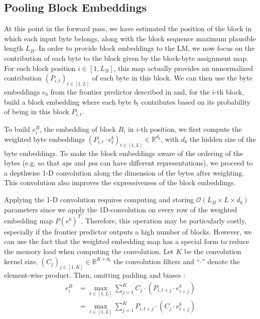 \subsection{Pooling Block Embeddings}
\label{sec:pooling_block}
At this point in the forward pass, we have estimated the position of the block in which each input byte belongs, along with the block sequence maximum plausible length $L_B$.
%
In order to provide block embeddings to the LM, we now focus on the contribution of each byte to the block given by the block-byte assignment map. For each block position $i \in [1, L_B]$, this map actually provides an unnormalized contribution $(P_{i,t})_{t \in [1, L]}$ of each byte in this block. We can then use the byte embeddings $e_b$ from the frontier predictor described in  and, for the $i$-th block, build a block embedding where each byte $b_t$ contributes based on its probability of being in this block $P_{i,t}$.

To build $e^B_i$, the embedding of block $B_i$ in $i$-th position, we first compute the weighted byte embeddings ${\left(P_{i, t} \cdot e^b_t\right)_{t \in [1, L]}}\in \mathbb{R}^{d_b}$, with $d_b$ the hidden size of the byte embeddings. To make the block embeddings aware of the ordering of the bytes (e.g. so that \textit{ape} and \textit{pea} can have different representations), we proceed to a depthwise 1-D convolution along the dimension of the bytes after weighting. This convolution also improves the expressiveness of the block embeddings. 

Applying the 1-D convolution requires computing and storing $\mathcal{O}(L_B\times L\times d_b)$ parameters since we apply the 1D-convolution on every row of the weighted embedding map $P({e^b})^T$. Therefore, this operation may be particularly costly, especially if the frontier predictor outputs a high number of blocks. However, we can use the fact that the weighted embedding map has a special form to reduce the memory load when computing the convolution. Let $K$ be the convolution kernel size, $(C_j)_{j\in [1,K]}\in \mathbb{R}^{K\times d_b}$ the convolution filters and ``$\cdot$'' denote the element-wise product. Then, omitting padding and biases :
\begin{align*}
    e^B_i &= \max \limits_{t\in [1,L]} \sum \limits_{j=1}^{K} C_j \cdot \left( P_{i,t+j} \cdot e^b_{i+j} \right) \\
          &= \max \limits_{t\in [1,L]} \sum \limits_{j=1}^{K} P_{i,t+j} \cdot \left( C_j \cdot e^b_{t+j} \right)
\end{align*}

